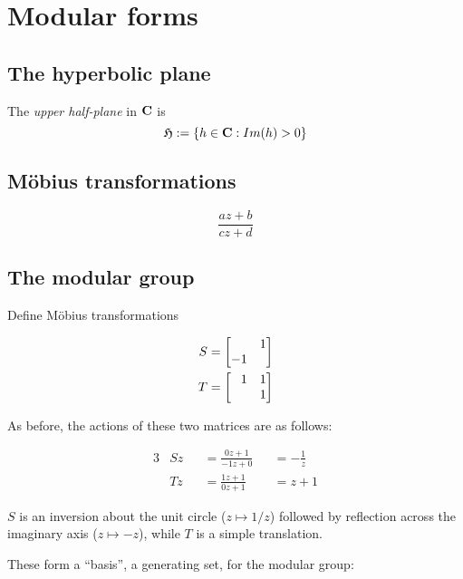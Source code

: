 \chapter{Modular forms}

\section{The hyperbolic plane}
\label{sec:the-hyperbolic-plane}

\begin{definition}
  The \emph{upper half-plane} in $\mathbf{C}$ is
  \[ \mathfrak{H} := \{ h\in\mathbf{C} : Im(h) > 0 \} \]
\end{definition}

\section{M\"obius transformations}
\label{sec:fractional-linear-transformations}

\[ \frac{az+b}{cz+d} \]

\section{The modular group}
\label{sec:the-modular-group}

Define M\"obius transformations

\begin{align*}
  S &= \begin{bmatrix}               & 1 \\ -1 &   \end{bmatrix} \\
  T &= \begin{bmatrix} \hphantom{-}1 & 1 \\    & 1 \end{bmatrix}
\end{align*}

As before, the actions of these two matrices are as follows:

\begin{alignat*}{3}
  & Sz &&= \frac{0z + 1}{-1z + 0} &&= -\frac1z\\
  & Tz &&= \frac{1z + 1}{0z + 1} &&= z + 1
\end{alignat*}

$S$ is an inversion about the unit circle ($z \mapsto 1/z$) followed by
reflection across the imaginary axis ($z \mapsto -z$), while $T$ is a simple
translation.

These form a ``basis'', a generating set, for the modular group:

